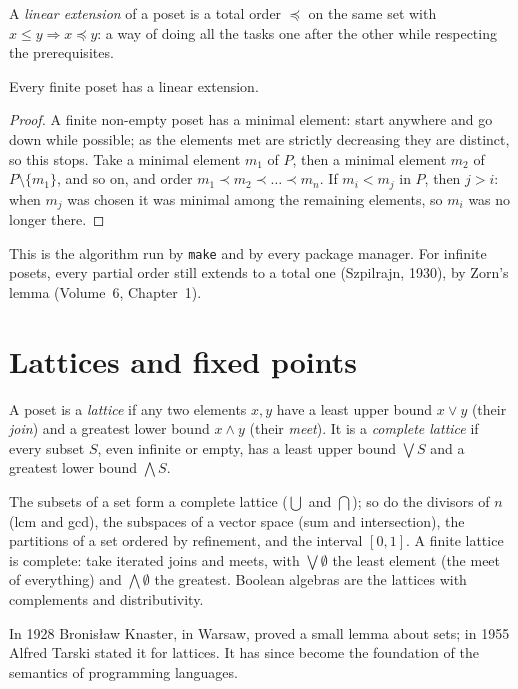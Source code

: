 A \emph{linear extension} of a poset is a total order $\preceq$ on the same set with $x\le y\Rightarrow x\preceq y$: a way of doing all the tasks one
after the other while respecting the prerequisites.

\begin{proposition}\label{orders:prop:topsort}
Every finite poset has a linear extension.
\end{proposition}
\begin{proof}
A finite non-empty poset has a minimal element: start anywhere and go down while possible; as the elements met are
strictly decreasing they are distinct, so this stops. Take a minimal element $m_1$ of $P$, then a minimal element $m_2$ of
$P\setminus\{m_1\}$, and so on, and order $m_1\prec m_2\prec\dots\prec m_n$. If $m_i<m_j$ in $P$, then $j>i$: when $m_j$ was chosen it was minimal among the
remaining elements, so $m_i$ was no longer there.
\end{proof}

This is the algorithm run by \texttt{make} and by every package manager. For infinite
posets, every partial order still extends to a total one (Szpilrajn, 1930), by Zorn's lemma (Volume~6, Chapter~1).

\section{Lattices and fixed points}

\begin{definition}\label{orders:def:lattice}
A poset is a \emph{lattice} if any two elements $x,y$ have a least upper bound $x\lor y$ (their \emph{join}) and a greatest lower bound
$x\land y$ (their \emph{meet}). It is a \emph{complete lattice} if every subset $S$, even infinite or empty, has a least upper bound $\bigvee S$
and a greatest lower bound $\bigwedge S$.
\end{definition}

The subsets of a set form a complete lattice ($\bigcup$ and $\bigcap$); so do the divisors of $n$ (lcm and gcd), the subspaces of a
vector space (sum and intersection), the partitions of a set ordered by refinement, and the interval $[0,1]$. A finite
lattice is complete: take iterated joins and meets, with $\bigvee\emptyset$ the least element (the meet of everything) and $\bigwedge\emptyset$ the
greatest. Boolean algebras are the lattices with complements and distributivity.

In 1928 Bronis\l aw Knaster, in Warsaw, proved a small lemma about sets; in 1955 Alfred Tarski stated it for lattices.
It has since become the foundation of the semantics of programming languages.

